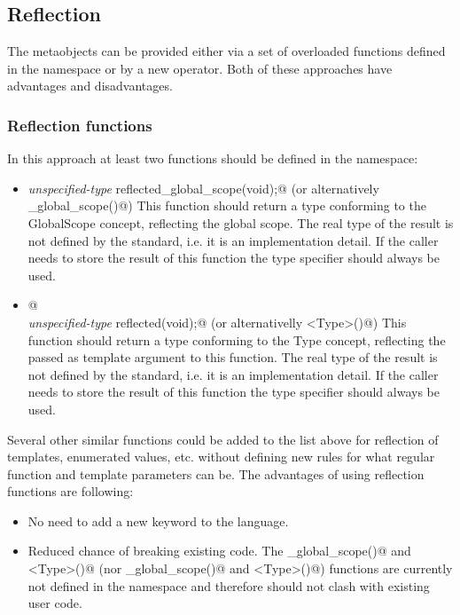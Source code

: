 \subsection{Reflection}

The metaobjects can be provided either via a set of overloaded
functions defined in the \verb@std@ namespace or by a new operator.
Both of these approaches have advantages and disadvantages.

\subsubsection{Reflection functions}

In this approach at least two functions should be defined
in the \verb@std@ namespace:

\begin{itemize}
	\item{{\em unspecified-type} \verb@ reflected_global_scope(void);@} (or
	alternatively \verb@mirrored_global_scope()@)
	This function should return a type conforming to the {\metaobject GlobalScope}
	concept, reflecting the global scope.
	The real type of the result is not defined by the standard, i.e. it is an implementation detail. 
	If the caller needs to store the result of this function the \verb@auto@ type
	specifier should always be used.

	\item{\verb@template <typename Type>@\\
	{\em unspecified-type} \verb@ reflected(void);@} (or alternativelly \verb@mirrored<Type>()@)
	This function should return a type conforming to the {\metaobject Type}
	concept, reflecting the \verb@Type@ passed as template argument to this function.
	The real type of the result is not defined by the standard, i.e. it is an implementation detail. 
	If the caller needs to store the result of this function the \verb@auto@ type
	specifier should always be used.
\end{itemize}

Several other similar functions could be added to the list above
for reflection of templates, enumerated values, etc. without defining
new rules for what regular function and template parameters can be.
The advantages of using reflection functions are following:

\begin{itemize}
	\item No need to add a new keyword to the language.

	\item Reduced chance of breaking existing code. The \verb@reflected_global_scope()@
	and \verb@reflected<Type>()@ (nor \verb@mirrored_global_scope()@ and 
	\verb@mirrored<Type>()@) functions are currently not defined in the \verb@std@
	namespace and therefore should not clash with existing user code.
\end{itemize}

